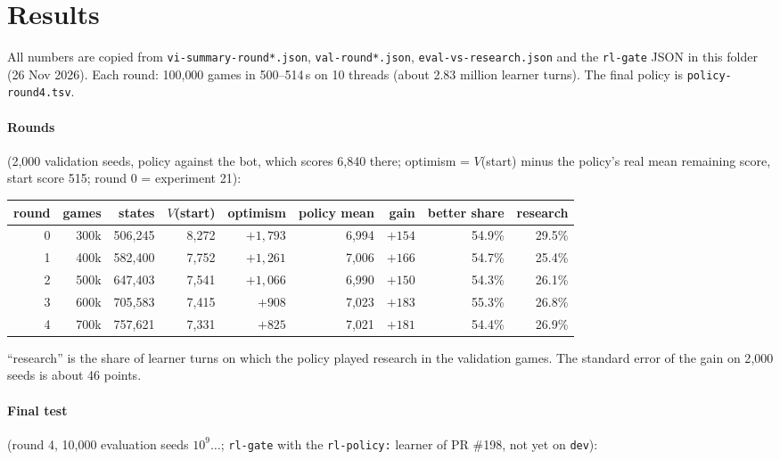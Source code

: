 \documentclass{../polyexp}
\begin{document}
\section{Results}
\ExpResults

All numbers are copied from \texttt{vi-summary-round*.json}, \texttt{val-round*.json}, \texttt{eval-vs-research.json}
and the \texttt{rl-gate} JSON in this folder (26 Nov 2026). Each round: 100{,}000 games in 500--514\,s on 10 threads
(about 2.83 million learner turns). The final policy is \texttt{policy-round4.tsv}.

\paragraph{Rounds} (2{,}000 validation seeds, policy against the bot, which scores 6{,}840 there; optimism =
$V$(start) minus the policy's real mean remaining score, start score 515; round 0 = experiment 21):

\begin{center}\small
\begin{tabular}{rrrrrrrrr}
\toprule
round & games & states & $V$(start) & optimism & policy mean & gain & better share & research \\
\midrule
0 & 300k & 506{,}245 & 8{,}272 & $+1{,}793$ & 6{,}994 & $+154$ & 54.9\% & 29.5\% \\
1 & 400k & 582{,}400 & 7{,}752 & $+1{,}261$ & 7{,}006 & $+166$ & 54.7\% & 25.4\% \\
2 & 500k & 647{,}403 & 7{,}541 & $+1{,}066$ & 6{,}990 & $+150$ & 54.3\% & 26.1\% \\
3 & 600k & 705{,}583 & 7{,}415 & $+908$    & 7{,}023 & $+183$ & 55.3\% & 26.8\% \\
4 & 700k & 757{,}621 & 7{,}331 & $+825$    & 7{,}021 & $+181$ & 54.4\% & 26.9\% \\
\bottomrule
\end{tabular}
\end{center}
``research'' is the share of learner turns on which the policy played research in the validation games. The
standard error of the gain on 2{,}000 seeds is about 46 points.

\paragraph{Final test} (round 4, 10{,}000 evaluation seeds $10^9\dots$; \texttt{rl-gate} with the
\texttt{rl-policy:} learner of PR \#198, not yet on \texttt{dev}):
\end{document}
